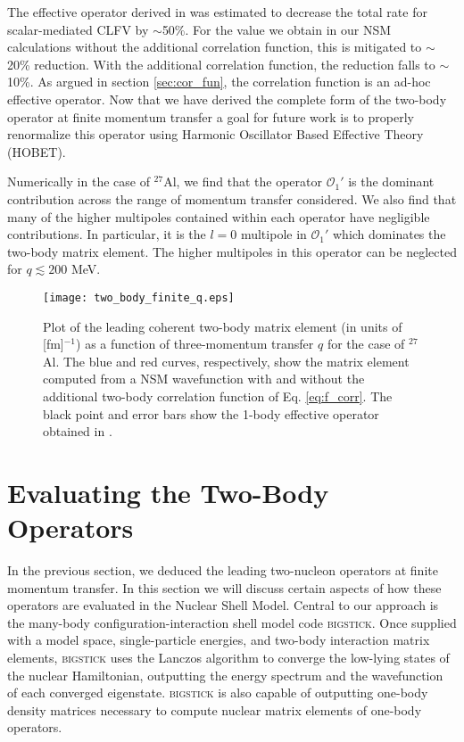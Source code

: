 \documentclass{book}[12pt]
\begin{document}
The effective operator derived in \cite{2018PhRvC..98a5208B} was estimated to decrease the total rate for scalar-mediated CLFV by $\sim$50\%. For the value we obtain in our NSM calculations without the additional correlation function, this is mitigated to $\sim$20\% reduction. With the additional correlation function, the reduction falls to $\sim$10\%. As argued in section \ref{sec:cor_fun}, the correlation function is an ad-hoc effective operator. Now that we have derived the complete form of the two-body operator at finite momentum transfer a goal for future work is to properly renormalize this operator using Harmonic Oscillator Based Effective Theory (HOBET).

Numerically in the case of $^{27}$Al, we find that the operator $\mathcal{O}_1'$ is the dominant contribution across the range of momentum transfer considered. We also find that many of the higher multipoles contained within each operator have negligible contributions. In particular, it is the $l=0$ multipole in $\mathcal{O}_1'$ which dominates the two-body matrix element. The higher multipoles in this operator can be neglected for $q\lesssim 200$ MeV.
\begin{figure}
\centering
\texttt{[image: two\_body\_finite\_q.eps]}
\caption{Plot of the leading coherent two-body matrix element (in units of [fm]$^{-1}$) as a function of three-momentum transfer $q$ for the case of $^{27}$Al. The blue and red curves, respectively, show the matrix element computed from a NSM wavefunction with and without the additional two-body correlation function of Eq. \ref{eq:f_corr}. The black point and error bars show the 1-body effective operator obtained in \cite{2018PhRvC..98a5208B}.}
\label{fig:two_body_finite_q}
\end{figure}
\section{Evaluating the Two-Body Operators}
In the previous section, we deduced the leading two-nucleon operators at finite momentum transfer. In this section we will discuss certain aspects of how these operators are evaluated in the Nuclear Shell Model. Central to our approach is the many-body configuration-interaction shell model code \textsc{bigstick}. Once supplied with a model space, single-particle energies, and two-body interaction matrix elements, \textsc{bigstick} uses the Lanczos algorithm to converge the low-lying states of the nuclear Hamiltonian, outputting the energy spectrum and the wavefunction of each converged eigenstate. \textsc{bigstick} is also capable of outputting one-body density matrices necessary to compute nuclear matrix elements of one-body operators.
\end{document}
